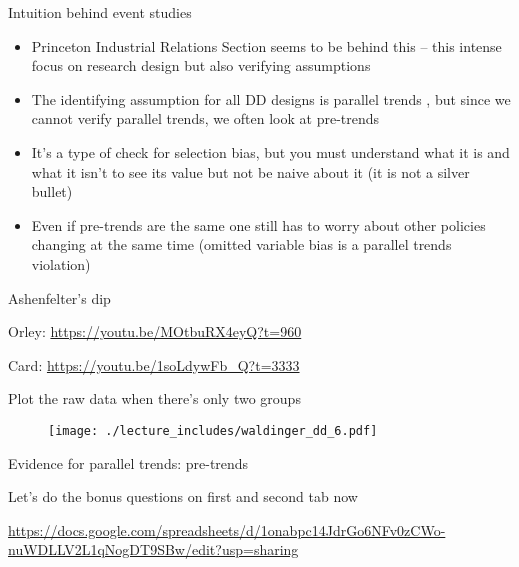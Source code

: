 \documentclass{beamer}
\begin{document}
\begin{frame}{Intuition behind event studies}

\begin{itemize}
	\item Princeton Industrial Relations Section seems to be behind this -- this intense focus on research design but also verifying assumptions
	\item The identifying assumption for all DD designs is parallel trends , but since we cannot verify parallel trends, we often look at pre-trends
	\item It's a type of check for selection bias, but you must understand what it is and what it isn't to see its value but not be naive about it (it is not a silver bullet)
	\item Even if pre-trends are the same one still has to worry about other policies changing at the same time (omitted variable bias is a parallel trends violation)

\end{itemize}

\end{frame}

\begin{frame}{Ashenfelter's dip}

Orley: \url{https://youtu.be/MOtbuRX4eyQ?t=960}

Card: \url{https://youtu.be/1soLdywFb_Q?t=3333}

\end{frame}




\begin{frame}{Plot the raw data when there's only two groups}

	\begin{figure}
	\texttt{[image: ./lecture\_includes/waldinger\_dd\_6.pdf]}
	\end{figure}

\end{frame}

\begin{frame}{Evidence for parallel trends: pre-trends}

Let's do the bonus questions on first and second tab now 

\url{https://docs.google.com/spreadsheets/d/1onabpc14JdrGo6NFv0zCWo-nuWDLLV2L1qNogDT9SBw/edit?usp=sharing}

\end{frame}
\end{document}
